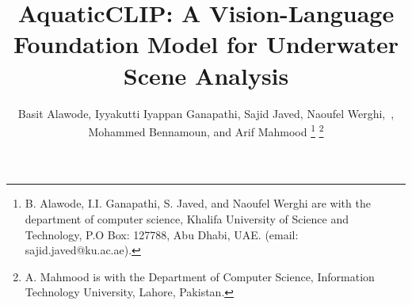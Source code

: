 \documentclass[journal]{IEEEtran}
\begin{document}
\title{AquaticCLIP: A Vision-Language Foundation Model for Underwater Scene Analysis}

\author{Basit Alawode, Iyyakutti Iyappan Ganapathi, Sajid Javed, Naoufel Werghi,~, Mohammed Bennamoun, and Arif Mahmood
\thanks{B. Alawode, I.I. Ganapathi, S. Javed, and Naoufel Werghi are with the department of computer science, Khalifa University of Science and Technology, P.O Box: 127788, Abu Dhabi, UAE. (email: sajid.javed@ku.ac.ae).}
\thanks{A. Mahmood is with the Department of Computer Science, Information Technology University, Lahore, Pakistan.}
}
\maketitle

    






\ifCLASSOPTIONcaptionsoff
  \newpage
\fi




\ifCLASSOPTIONcaptionsoff
  \newpage
\fi
\end{document}
